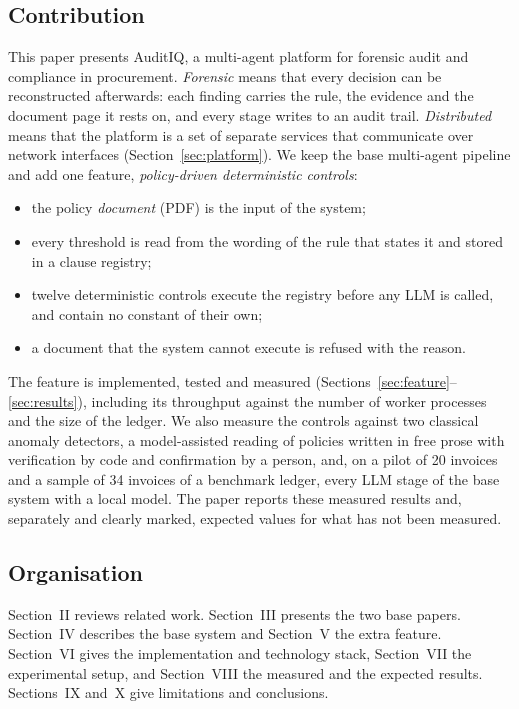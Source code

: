 \documentclass[conference]{IEEEtran}
\begin{document}
\subsection{Contribution}
This paper presents AuditIQ, a multi-agent platform for forensic audit and compliance in procurement. \emph{Forensic} means that every decision can be reconstructed afterwards: each finding carries the rule, the evidence and the document page it rests on, and every stage writes to an audit trail. \emph{Distributed} means that the platform is a set of separate services that communicate over network interfaces (Section~\ref{sec:platform}). We keep the base multi-agent pipeline and add one feature, \emph{policy-driven deterministic controls}:
\begin{itemize}
\item the policy \emph{document} (PDF) is the input of the system;
\item every threshold is read from the wording of the rule that states it and stored in a clause registry;
\item twelve deterministic controls execute the registry before any LLM is called, and contain no constant of their own;
\item a document that the system cannot execute is refused with the reason.
\end{itemize}
The feature is implemented, tested and measured (Sections~\ref{sec:feature}--\ref{sec:results}), including its throughput against the number of worker processes and the size of the ledger. We also measure the controls against two classical anomaly detectors, a model-assisted reading of policies written in free prose with verification by code and confirmation by a person, and, on a pilot of 20 invoices and a sample of 34 invoices of a benchmark ledger, every LLM stage of the base system with a local model. The paper reports these measured results and, separately and clearly marked, expected values for what has not been measured.

\subsection{Organisation}
Section~II reviews related work. Section~III presents the two base papers. Section~IV describes the base system and Section~V the extra feature. Section~VI gives the implementation and technology stack, Section~VII the experimental setup, and Section~VIII the measured and the expected results. Sections~IX and~X give limitations and conclusions.
\end{document}

